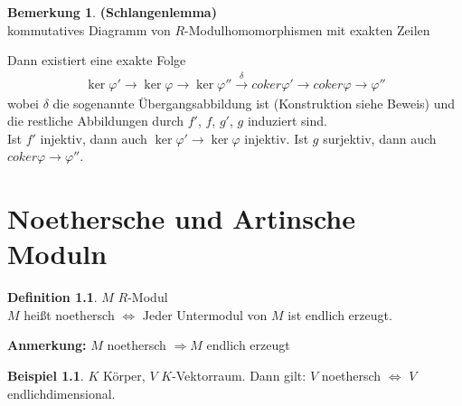 \documentclass[10pt,a4paper,numbers=endperiod]{scrreprt}
\theoremstyle{definition}
\newtheorem{defi}[satz]{Definition}
\newtheorem{bem}[satz]{Bemerkung}
\newtheorem{bsp}[satz]{Beispiel}
\begin{document}
\begin{bem}
	\textbf{(Schlangenlemma)}\\
	kommutatives Diagramm von $R$-Modulhomomorphismen mit exakten Zeilen\\
	
	Dann existiert eine exakte Folge
	\begin{align*}
	\ker \varphi' \longrightarrow \ker \varphi \longrightarrow \ker \varphi'' \overset{\delta}{\longrightarrow} coker \varphi' \longrightarrow coker \varphi \longrightarrow \varphi''
	\end{align*}
	wobei $\delta$ die sogenannte Übergangsabbildung ist (Konstruktion siehe Beweis) und die restliche Abbildungen durch $f'$, $f$, $g'$, $g$ induziert sind.\\
	Ist $f'$ injektiv, dann auch $\ker \varphi' \longrightarrow \ker \varphi$ injektiv. Ist $g$ surjektiv, dann auch $coker \varphi \longrightarrow \varphi''$.
\end{bem}

\chapter{Noethersche und Artinsche Moduln}

\begin{defi}
	$M$ $R$-Modul\\
	$M$ heißt noethersch $\Leftrightarrow$ Jeder Untermodul von $M$ ist endlich erzeugt.
\end{defi}

\textbf{Anmerkung:} $M$ noethersch $\Rightarrow M$ endlich erzeugt

\begin{bsp}
	$K$ Körper, $V$ $K$-Vektorraum. Dann gilt: $V$ noethersch $\Leftrightarrow$ $V$ endlichdimensional.
\end{bsp}
\end{document}
